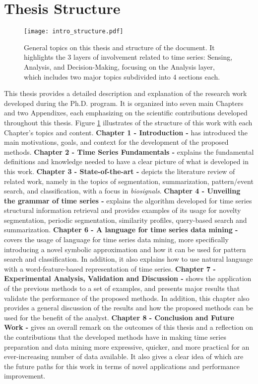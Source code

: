 \section{Thesis Structure}
\label{sec:structure}

\begin{figure}[h]
\centering
\texttt{[image: intro\_structure.pdf]}
\caption{General topics on this thesis and structure of the document. It highlights the 3 layers of involvement related to time series: Sensing, Analysis, and Decision-Making, focusing on the Analysis layer, which includes two major topics subdivided into 4 sections each.}
\label{fig:intro}
\end{figure}

This thesis provides a detailed description and explanation of the research work developed during the Ph.D. program. It is organized into seven main Chapters and two Appendixes, each emphasizing on the scientific contributions developed throughout this thesis. Figure \ref{fig:intro} illustrates of the structure of this work with each Chapter's topics and content. \textbf{Chapter 1 - Introduction -} has introduced the main motivations, goals, and context for the development of the proposed methods. \textbf{Chapter 2 - Time Series Fundamentals -} explains the fundamental definitions and knowledge needed to have a clear picture of what is developed in this work. \textbf{Chapter 3 - State-of-the-art -} depicts the literature review of related work, namely in the topics of segmentation, summarization, pattern/event search, and classification, with a focus in \textit{biosignals}. \textbf{Chapter 4 - Unveiling the grammar of time series -} explains the algorithm developed for time series structural information retrieval and provides examples of its usage for novelty segmentation, periodic segmentation, similarity profiles, query-based search and summarization. \textbf{Chapter 6 - A language for time series data mining -} covers the usage of language for time series data mining, more specifically introducing a novel symbolic approximation and how it can be used for pattern search and classification. In addition, it also explains how to use natural language with a word-feature-based representation of time series. \textbf{Chapter 7 - Experimental Analysis, Validation and Discussion -} shows the application of the previous methods to a set of examples, and presents major results that validate the performance of the proposed methods. In addition, this chapter also provides a general discussion of the results and how the proposed methods can be used for the benefit of the analyst. \textbf{Chapter 8 - Conclusion and Future Work -} gives an overall remark on the outcomes of this thesis and a reflection on the contributions that the developed methods have in making time series preparation and data mining more expressive, quicker, and more practical for an ever-increasing number of data available. It also gives a clear idea of which are the future paths for this work in terms of novel applications and performance improvement.

